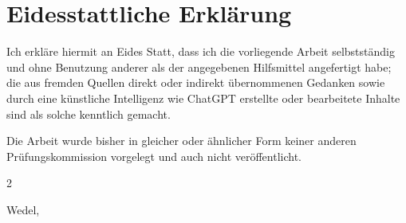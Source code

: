 
\chapter*{Eidesstattliche Erkl\"arung}

Ich erkl\"are hiermit an Eides Statt, dass ich die vorliegende Arbeit
selbstst\"andig und ohne Benutzung anderer als der angegebenen Hilfsmittel
angefertigt habe; die aus fremden Quellen direkt oder indirekt \"ubernommenen
Gedanken sowie durch eine k\"unstliche Intelligenz wie ChatGPT erstellte oder
bearbeitete Inhalte sind als solche kenntlich gemacht.

\medskip

Die Arbeit wurde bisher in gleicher oder \"ahnlicher Form keiner anderen
Pr\"ufungskommission vorgelegt und auch nicht ver\"offentlicht.

\bigskip
\bigskip
\bigskip
\bigskip

\begin{multicols}{2}
  \raggedright
  Wedel, \Datum

  \raggedleft
  \authorname

\end{multicols}
